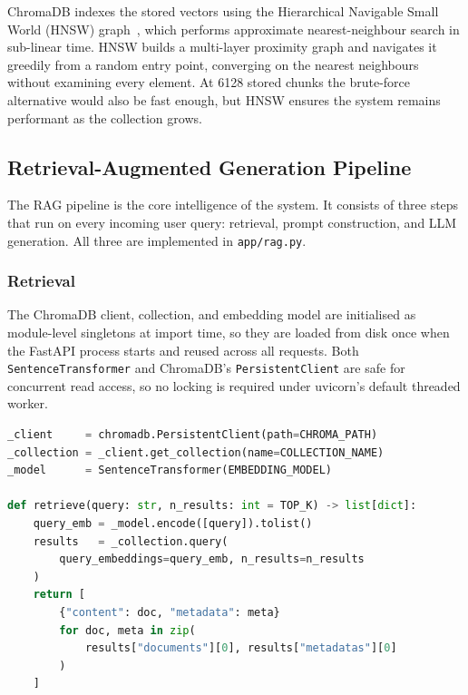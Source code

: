 ChromaDB indexes the stored vectors using the Hierarchical Navigable Small
World (HNSW) graph~\cite{malkov2018hnsw}, which performs approximate
nearest-neighbour search in sub-linear time. HNSW builds a multi-layer
proximity graph and navigates it greedily from a random entry point,
converging on the nearest neighbours without examining every element. At
6128 stored chunks the brute-force alternative would also be fast enough, but
HNSW ensures the system remains performant as the collection grows.

\subsection{Retrieval-Augmented Generation Pipeline}
\label{sec:impl-rag}

The RAG pipeline is the core intelligence of the system. It consists of three steps that run on every incoming user query: retrieval, prompt construction, and LLM generation.
All three are implemented in
\texttt{app/rag.py}.

\subsubsection{Retrieval}

The ChromaDB client, collection, and embedding model are initialised as
module-level singletons at import time, so they are loaded from disk once
when the FastAPI process starts and reused across all requests. Both
\texttt{SentenceTransformer} and ChromaDB's \texttt{PersistentClient} are
safe for concurrent read access, so no locking is required under
uvicorn's default threaded worker.

\begin{lstlisting}[language=Python]
_client     = chromadb.PersistentClient(path=CHROMA_PATH)
_collection = _client.get_collection(name=COLLECTION_NAME)
_model      = SentenceTransformer(EMBEDDING_MODEL)

def retrieve(query: str, n_results: int = TOP_K) -> list[dict]:
    query_emb = _model.encode([query]).tolist()
    results   = _collection.query(
        query_embeddings=query_emb, n_results=n_results
    )
    return [
        {"content": doc, "metadata": meta}
        for doc, meta in zip(
            results["documents"][0], results["metadatas"][0]
        )
    ]
\end{lstlisting}

